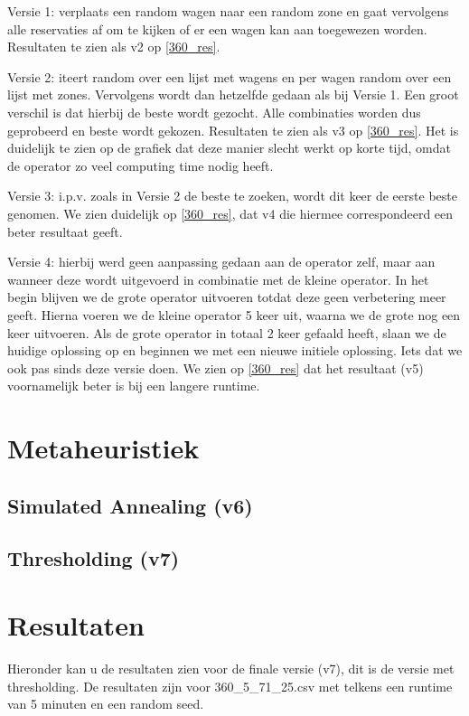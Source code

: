 \documentclass[a4paper, 12pt, one column]{article}
\begin{document}
Versie 1: verplaats een random wagen naar een random zone en gaat vervolgens alle reservaties af om te kijken of er een wagen kan aan toegewezen worden. Resultaten te zien als v2 op \ref{360_res}.

Versie 2: iteert random over een lijst met wagens en per wagen random over een lijst met zones. Vervolgens wordt dan hetzelfde gedaan als bij Versie 1. Een groot verschil is dat hierbij de beste wordt gezocht. Alle combinaties worden dus geprobeerd en beste wordt gekozen. Resultaten te zien als v3 op \ref{360_res}. Het is duidelijk te zien op de grafiek dat deze manier slecht werkt op korte tijd, omdat de operator zo veel computing time nodig heeft.

Versie 3: i.p.v. zoals in Versie 2 de beste te zoeken, wordt dit keer de eerste beste genomen. We zien duidelijk op \ref{360_res}, dat v4 die hiermee correspondeerd een beter resultaat geeft.

Versie 4: hierbij werd geen aanpassing gedaan aan de operator zelf, maar aan wanneer deze wordt uitgevoerd in combinatie met de kleine operator. In het begin blijven we de grote operator uitvoeren totdat deze geen verbetering meer geeft. Hierna voeren we de kleine operator 5 keer uit, waarna we de grote nog een keer uitvoeren. Als de grote operator in totaal 2 keer gefaald heeft, slaan we de huidige oplossing op en beginnen we met een nieuwe initiele oplossing. Iets dat we ook pas sinds deze versie doen. We zien op \ref{360_res} dat het resultaat (v5) voornamelijk beter is bij een langere runtime.

\section{Metaheuristiek}
\subsection{Simulated Annealing (v6)}

\subsection{Thresholding (v7)}

\section{Resultaten}
Hieronder kan u de resultaten zien voor de finale versie (v7), dit is de versie met thresholding. De resultaten zijn voor 360\_5\_71\_25.csv met telkens een runtime van 5 minuten en een random seed.
\end{document}
